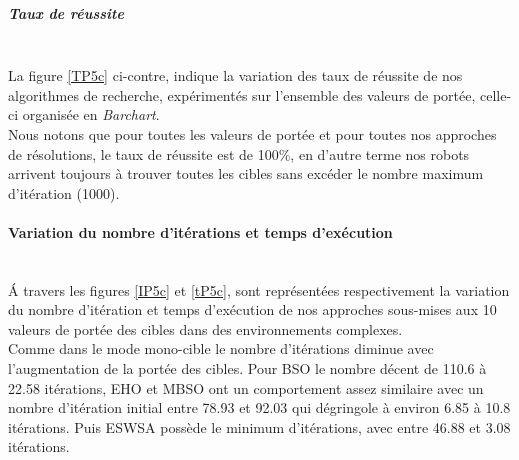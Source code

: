 \noindent
\begin{minipage}[t]{0.5\textwidth}
	\subparagraph{Taux de réussite}
	\textbf{}\\
	
	La figure \ref{TP5c} ci-contre, indique la variation des taux de réussite de nos algorithmes de recherche, expérimentés sur l'ensemble des valeurs de portée, celle-ci organisée en \textit{Barchart}.\\
	 
	Nous notons que pour toutes les valeurs de portée et pour toutes nos approches de résolutions, le taux de réussite est de 100\%, en d'autre terme nos robots arrivent toujours à trouver toutes les cibles sans excéder le nombre maximum d'itération (1000).
	
\end{minipage}\hfill
\begin{minipage}[t]{0.55\textwidth}
	\captionsetup{width=0.8\linewidth}
	\centering{}
	\label{TP5c}
\end{minipage}\hfill






\noindent
	\paragraph{Variation du nombre d'itérations et temps d'exécution}
	\textbf{ }\\
	
	\'{A} travers les figures \ref{IP5c} et \ref{tP5c}, sont représentées respectivement la variation du nombre d'itération et temps d'exécution de nos approches sous-mises aux 10 valeurs de portée des cibles dans des environnements complexes.\\
	
	Comme dans le mode mono-cible le nombre d'itérations diminue avec l'augmentation de la portée des cibles. Pour BSO le nombre décent de 110.6 à 22.58 itérations, EHO et MBSO ont un comportement assez similaire avec un nombre d'itération initial entre 78.93 et 92.03 qui dégringole à environ 6.85 à 10.8 itérations. Puis ESWSA possède le minimum d'itérations, avec entre 46.88 et 3.08 itérations.\\
	
